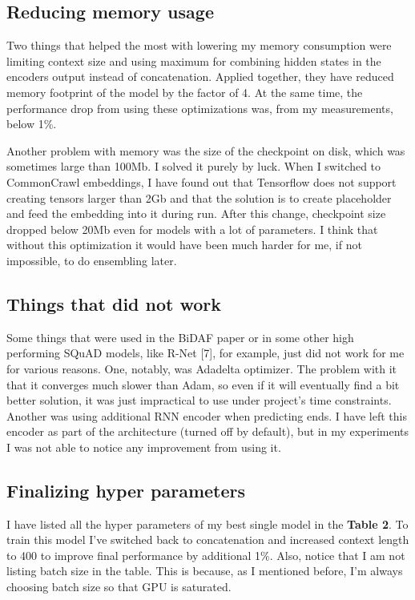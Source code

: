 \documentclass{article}
\begin{document}
\subsection{Reducing memory usage}
Two things that helped the most with lowering my memory consumption were limiting context size and using maximum for combining hidden states in the encoders output instead of concatenation. Applied together, they have reduced memory footprint of the model by the factor of 4. At the same time, the performance drop from using these optimizations was, from my measurements, below 1\%.

Another problem with memory was the size of the checkpoint on disk, which was sometimes large than 100Mb. I solved it purely by luck. When I switched to CommonCrawl embeddings, I have found out that Tensorflow does not support creating tensors larger than 2Gb and that the solution is to create placeholder and feed the embedding into it during run. After this change, checkpoint size dropped below 20Mb even for models with a lot of parameters. I think that without this optimization it would have been much harder for me, if not impossible, to do ensembling later.

\subsection{Things that did not work}
Some things that were used in the BiDAF paper or in some other high performing SQuAD models, like  R-Net [7], for example, just did not work for me for various reasons. One, notably, was Adadelta optimizer. The problem with it that it converges much slower than Adam, so even if it will eventually find a bit better solution, it was just impractical to use under project's time constraints. Another was using additional RNN encoder when predicting ends. I have left this encoder as part of the architecture (turned off by default), but in my experiments I was not able to notice any improvement from using it.

\subsection{Finalizing hyper parameters}
I have listed all the hyper parameters of my best single model in the {\bf Table 2}. To train this model I've switched back to concatenation and increased context length to 400 to improve final performance by additional 1\%. Also, notice that I am not listing batch size in the table. This is because, as I mentioned before, I'm always choosing batch size so that GPU is saturated.
\end{document}
